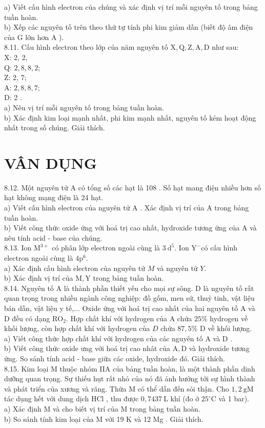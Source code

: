\documentclass[10pt]{article}
\begin{document}
a) Viết cấu hình electron của chúng và xác định vị trí mỗi nguyên tố trong bảng tuần hoàn.\\
b) Xếp các nguyên tố trên theo thứ tự tính phi kim giảm dần (biết độ âm điện của G lớn hơn A ).\\
8.11. Cấu hình electron theo lớp của năm nguyên tố $\mathrm{X}, \mathrm{Q}, \mathrm{Z}, \mathrm{A}, \mathrm{D}$ như sau:\\
X: 2, 2,\\
Q: $2,8,8,2$;\\
Z: 2, 7;\\
A: $2,8,8,7 ;$\\
D: 2 .\\
a) Nêu vị trí mỗi nguyên tố trong bảng tuần hoàn.\\
b) Xác định kim loại mạnh nhất, phi kim mạnh nhất, nguyên tố kém hoạt động nhất trong số chúng. Giải thích.

\section*{VÂN DỤNG}
8.12. Một nguyên tử A có tổng số các hạt là 108 . Số hạt mang điện nhiều hơn số hạt không mạng điện là 24 hạt.\\
a) Viết cấu hình electron của nguyên tử A . Xác định vị trí của A trong bảng tuần hoàn.\\
b) Viết công thức oxide ứng với hoá trị cao nhất, hydroxide tương ứng của A và nêu tính acid - base của chúng.\\
8.13. Ion $\mathrm{M}^{3+}$ có phân lớp electron ngoài cùng là $3 \mathrm{~d}^{5}$. Ion $\mathrm{Y}^{-}$có cấu hình electron ngoài cùng là $4 \mathrm{p}^{6}$.\\
a) Xác định cấu hình electron của nguyên tử $M$ và nguyên tử $Y$.\\
b) Xác định vị trí của $\mathrm{M}, \mathrm{Y}$ trong bảng tuần hoàn.\\
8.14. Nguyên tố A là thành phần thiết yếu cho mọi sự sông. D là nguyên tố rất quan trọng trong nhiều ngành công nghiệp: đồ gốm, men sứ, thuỷ tinh, vật liệu bán dẫn, vật liệu y tế,... Oxide ứng với hoá trị cao nhất của hai nguyên tố A và D đều có dạng $\mathrm{RO}_{2}$. Hợp chất khí với hydrogen của A chứa $25 \%$ hydrogen về khối lượng, còn hợp chất khí với hydrogen của $D$ chứa $87,5 \%$ D về khối lượng.\\
a) Viết công thức hợp chất khí với hydrogen của các nguyên tố A và D .\\
b) Viết công thức oxide ưng với hoá trị cao nhât của $\mathrm{A}, \mathrm{D}$ và hydroxide tương ứng. So sánh tính acid - base giữa các oxide, hydroxide đó. Giải thích.\\
8.15. Kim loại M thuộc nhóm IIA của bảng tuần hoàn, là một thành phần dinh dưỡng quan trọng. Sự thiếu hụt rất nhỏ của nó đã ảnh hưởng tới sự hình thành và phát triển của xương và răng. Thừa M có thể dẫn đến sỏi thận. Cho $1,2 \mathrm{~g} \mathrm{M}$ tác dụng hết với dung dịch HCl , thu được $0,7437 \mathrm{~L}$ khí (đo ở $25^{\circ} \mathrm{C}$ và 1 bar).\\
a) Xác định M và cho biết vị trí của M trong bảng tuần hoàn.\\
b) So sánh tính kim loại của M với 19 K và 12 Mg . Giải thích.
\end{document}
